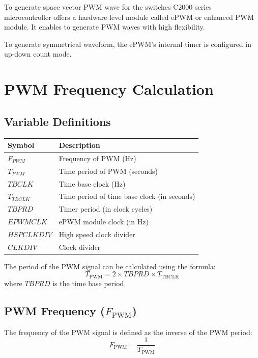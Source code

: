 To generate space vector PWM wave for the switches C2000 series microcontroller offers a hardware level module called ePWM or enhanced PWM module. It enables to generate PWM waves with high flexibility.

To generate symmetrical waveform, the ePWM's internal timer is configured in up-down count mode.

\section*{PWM Frequency Calculation}

\subsection*{Variable Definitions}

\renewcommand{\arraystretch}{1.5}
\begin{tabular}{|>{\bfseries}l|l|}
	\hline
	Symbol      & Description                                 \\ \hline
	$F_{PWM}$   & Frequency of PWM (Hz)                       \\ \hline
	$T_{PWM}$   & Time period of PWM (seconds)                \\ \hline
	$TBCLK$     & Time base clock (Hz)                        \\ \hline
	$T_{TBCLK}$ & Time period of time base clock (in seconds) \\ \hline
	$TBPRD$     & Timer period (in clock cycles)              \\ \hline
	$EPWMCLK$   & ePWM module clock (in Hz)                   \\ \hline
	$HSPCLKDIV$ & High speed clock divider                    \\ \hline
	$CLKDIV$    & Clock divider                               \\ \hline
\end{tabular}

\vspace{0.2in}

The period of the PWM signal can be calculated using the formula:
\[
	T_{\text{PWM}} = 2 \times TBPRD \times T_{\text{TBCLK}}
\]
where \( TBPRD \) is the time base period.

\subsection{PWM Frequency (\( F_{\text{PWM}} \))}
The frequency of the PWM signal is defined as the inverse of the PWM period:
\[
	F_{\text{PWM}} = \frac{1}{T_{\text{PWM}}}
\]

